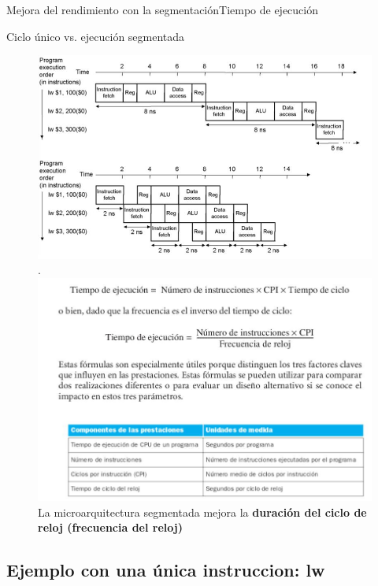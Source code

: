 \documentclass[aspectratio=169,compress]{beamer}
\begin{document}
\begin{footnotesize}
\begin{frame}{Mejora del rendimiento con la segmentación}{Tiempo de ejecución}
\begin{center}
Ciclo único vs. ejecución segmentada
\end{center}
\begin{figure}
\includegraphics[scale=0.30]{images/singlevspipelined.jpg} .
\includegraphics[scale=0.15]{images/tiempo.jpg} \\
La microarquitectura segmentada mejora la \textbf{duración del ciclo de reloj (frecuencia del reloj)}
\end{figure}
\end{frame}



\subsection{Ejemplo con una única instruccion: lw}



\end{footnotesize}
\end{document}
